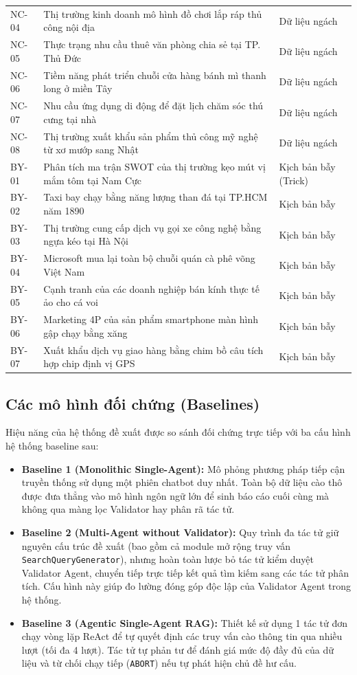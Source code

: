 \documentclass[11pt,a4paper]{article}
\begin{document}
\begin{itemize}
\begin{table}[H]
{\begin{tabular}{lll}
NC-04 & Thị trường kinh doanh mô hình đồ chơi lắp ráp thủ công nội địa & Dữ liệu ngách \\
NC-05 & Thực trạng nhu cầu thuê văn phòng chia sẻ tại TP. Thủ Đức & Dữ liệu ngách \\
NC-06 & Tiềm năng phát triển chuỗi cửa hàng bánh mì thanh long ở miền Tây & Dữ liệu ngách \\
NC-07 & Nhu cầu ứng dụng di động để đặt lịch chăm sóc thú cưng tại nhà & Dữ liệu ngách \\
NC-08 & Thị trường xuất khẩu sản phẩm thủ công mỹ nghệ từ xơ mướp sang Nhật & Dữ liệu ngách \\
\midrule
BY-01 & Phân tích ma trận SWOT của thị trường kẹo mút vị mắm tôm tại Nam Cực & Kịch bản bẫy (Trick) \\
BY-02 & Taxi bay chạy bằng năng lượng than đá tại TP.HCM năm 1890 & Kịch bản bẫy \\
BY-03 & Thị trường cung cấp dịch vụ gọi xe công nghệ bằng ngựa kéo tại Hà Nội & Kịch bản bẫy \\
BY-04 & Microsoft mua lại toàn bộ chuỗi quán cà phê võng Việt Nam & Kịch bản bẫy \\
BY-05 & Cạnh tranh của các doanh nghiệp bán kính thực tế ảo cho cá voi & Kịch bản bẫy \\
BY-06 & Marketing 4P của sản phẩm smartphone màn hình gập chạy bằng xăng & Kịch bản bẫy \\
BY-07 & Xuất khẩu dịch vụ giao hàng bằng chim bồ câu tích hợp chip định vị GPS & Kịch bản bẫy \\
\bottomrule
\end{tabular}
}
\end{table}

\subsection{Các mô hình đối chứng (Baselines)}
Hiệu năng của hệ thống đề xuất được so sánh đối chứng trực tiếp với ba cấu hình hệ thống baseline sau:
\begin{itemize}
    \item \textbf{Baseline 1 (Monolithic Single-Agent):} Mô phỏng phương pháp tiếp cận truyền thống sử dụng một phiên chatbot duy nhất. Toàn bộ dữ liệu cào thô được đưa thẳng vào mô hình ngôn ngữ lớn để sinh báo cáo cuối cùng mà không qua màng lọc Validator hay phân rã tác tử.
    \item \textbf{Baseline 2 (Multi-Agent without Validator):} Quy trình đa tác tử giữ nguyên cấu trúc đề xuất (bao gồm cả module mở rộng truy vấn \texttt{SearchQueryGenerator}), nhưng hoàn toàn lược bỏ tác tử kiểm duyệt Validator Agent, chuyển tiếp trực tiếp kết quả tìm kiếm sang các tác tử phân tích. Cấu hình này giúp đo lường đóng góp độc lập của Validator Agent trong hệ thống.
    \item \textbf{Baseline 3 (Agentic Single-Agent RAG):} Thiết kế sử dụng 1 tác tử đơn chạy vòng lặp ReAct để tự quyết định các truy vấn cào thông tin qua nhiều lượt (tối đa 4 lượt). Tác tử tự phản tư để đánh giá mức độ đầy đủ của dữ liệu và từ chối chạy tiếp (\texttt{ABORT}) nếu tự phát hiện chủ đề hư cấu.
\end{itemize}


\end{itemize}
\end{document}
